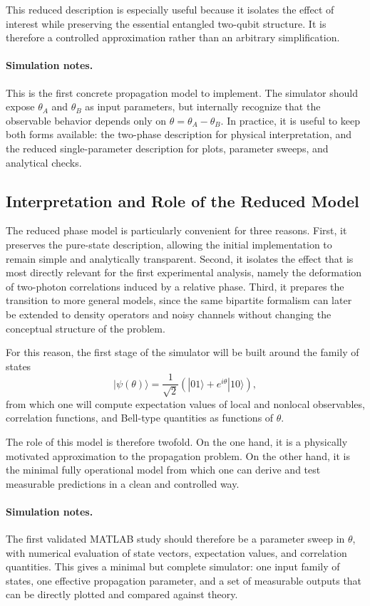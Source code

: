 \documentclass[a4paper]{article}
\begin{document}
This reduced description is especially useful because it isolates the effect of interest while preserving the essential entangled two-qubit structure. It is therefore a controlled approximation rather than an arbitrary simplification.

\paragraph{Simulation notes.}
This is the first concrete propagation model to implement. The simulator should expose \(\theta_A\) and \(\theta_B\) as input parameters, but internally recognize that the observable behavior depends only on \(\theta=\theta_A-\theta_B\). In practice, it is useful to keep both forms available: the two-phase description for physical interpretation, and the reduced single-parameter description for plots, parameter sweeps, and analytical checks.

\subsection{Interpretation and Role of the Reduced Model}

The reduced phase model is particularly convenient for three reasons. First, it preserves the pure-state description, allowing the initial implementation to remain simple and analytically transparent. Second, it isolates the effect that is most directly relevant for the first experimental analysis, namely the deformation of two-photon correlations induced by a relative phase. Third, it prepares the transition to more general models, since the same bipartite formalism can later be extended to density operators and noisy channels without changing the conceptual structure of the problem.

For this reason, the first stage of the simulator will be built around the family of states
\[
|\psi(\theta)\rangle
=
\frac{1}{\sqrt{2}}
\left(
|01\rangle + e^{i\theta}|10\rangle
\right),
\]
from which one will compute expectation values of local and nonlocal observables, correlation functions, and Bell-type quantities as functions of \(\theta\).

The role of this model is therefore twofold. On the one hand, it is a physically motivated approximation to the propagation problem. On the other hand, it is the minimal fully operational model from which one can derive and test measurable predictions in a clean and controlled way.

\paragraph{Simulation notes.}
The first validated MATLAB study should therefore be a parameter sweep in \(\theta\), with numerical evaluation of state vectors, expectation values, and correlation quantities. This gives a minimal but complete simulator: one input family of states, one effective propagation parameter, and a set of measurable outputs that can be directly plotted and compared against theory.
\end{document}
